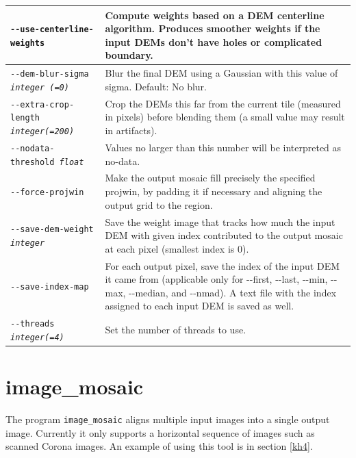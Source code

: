 \begin{longtable}{|l|p{10cm}|}
\texttt{-\/-use-centerline-weights} &
Compute weights based on a DEM centerline algorithm. Produces smoother weights if the input DEMs don't have holes or complicated boundary.
\\ \hline

\texttt{-\/-dem-blur-sigma \textit{integer (=0)} } & Blur the final DEM using a Gaussian with this value of sigma. Default: No blur. \\ \hline

\texttt{-\/-extra-crop-length \textit{integer(=200)}} &
Crop the DEMs this far from the current tile (measured in pixels) before blending them (a small value may result in artifacts).
\\ \hline

\texttt{-\/-nodata-threshold \textit{float}} & Values no larger than this number will be interpreted as no-data.\\ \hline

\texttt{-\/-force-projwin}
& Make the output mosaic fill precisely the specified projwin, by padding it if necessary and aligning the output grid to the region.
\\ \hline

\texttt{-\/-save-dem-weight \textit{integer}} &
Save the weight image that tracks how much the input DEM with given index contributed to the output mosaic at each pixel (smallest index is 0).\\ \hline

\texttt{-\/-save-index-map} &
For each output pixel, save the index of the input DEM it came from
(applicable only for -\/-first, -\/-last, -\/-min, -\/-max, -\/-median, and -\/-nmad). A text
file with the index assigned to each input DEM is saved as well.\\ \hline

\texttt{-\/-threads \textit{integer(=4)}}
& Set the number of threads to use. \\ \hline
\end{longtable}

\clearpage


\section{image\_mosaic}
\label{imagemosaic}

The program \texttt{image\_mosaic} aligns multiple input images into a single
output image.  Currently it only supports a horizontal sequence of images such
as scanned Corona images. An example of using this tool is in section 
\ref{kh4}.

